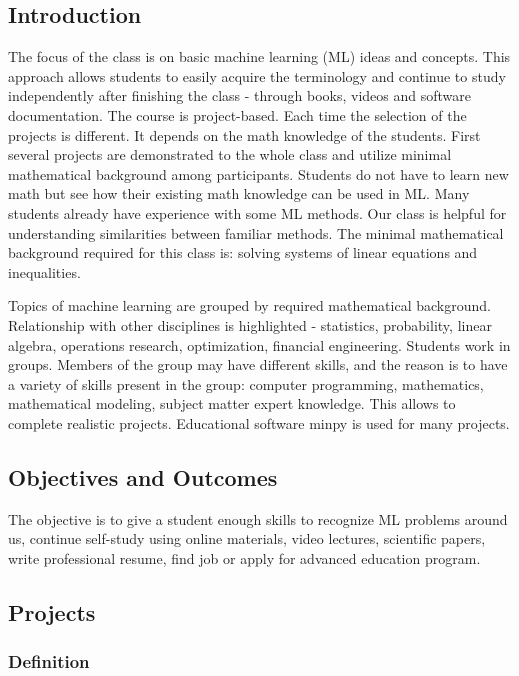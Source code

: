 
\subsection{Introduction \label{introduction}}

The focus of the class is on basic machine learning (ML) ideas and concepts. This approach allows students to easily acquire the terminology and continue to study independently after finishing the class -  through books, videos  and software documentation.  The course is project-based. Each time the selection of the projects is different. It depends on the math knowledge of the students. First several projects are demonstrated to the whole class and utilize minimal mathematical background among participants. Students do not have to learn new math but see how their existing math knowledge can be used in ML.   Many students already have experience with some ML methods. Our class is helpful for understanding similarities between familiar methods.  The minimal mathematical background required for this class is: solving systems of linear equations and inequalities.

 Topics of machine learning are grouped by required mathematical background. Relationship with other disciplines is highlighted - statistics, probability, linear algebra, operations research, optimization, financial engineering. Students work in groups.  Members of the group may have different skills, and the reason is to have a variety of skills present in the group: computer programming, mathematics, mathematical modeling, subject matter expert knowledge. This allows to complete realistic projects. Educational software minpy is used for many projects.

\subsection{Objectives and Outcomes \label{objectives and outcomes}}

The objective is to give a student enough skills to recognize ML problems around us, continue self-study using online materials, video lectures,  scientific papers,  write professional resume, find job or apply for advanced education program.

\subsection{Projects \label{projects}}

\subsubsection{Definition \label{definition}}

